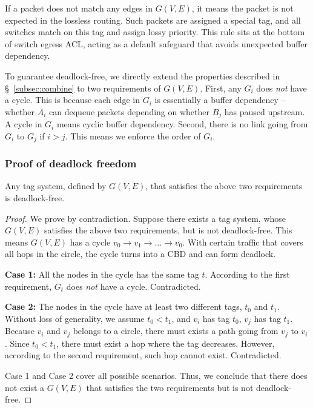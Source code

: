 If a packet does not match any edges in $G(V,E)$, it means the packet is not 
expected in the lossless routing.
Such packets are assigned a special tag, and all switches match on this tag and 
assign lossy priority. This rule sits at the bottom of switch egress ACL, acting 
as a default safeguard that avoids unexpected buffer dependency.

To guarantee deadlock-free, we directly extend the properties described 
in \S~\ref{subsec:combine} to two requirements of $G(V,E)$. First, any 
$G_i$ does {\em not} have a cycle. This is because each edge in $G_i$ is 
essentially a buffer dependency -- whether $A_i$ can dequeue packets depending on whether
$B_j$ has paused upstream. A cycle in $G_i$ means cyclic buffer dependency.
Second, there is no link going from $G_i$ to $G_j$ if $i>j$. 
This means we enforce the order of $G_i$.

\subsubsection{Proof of deadlock freedom}

\begin{theorem}
Any tag system, defined by $G(V,E)$, that satisfies the above two requirements is deadlock-free.
\end{theorem}

\begin{proof}
We prove by contradiction. Suppose there exists a tag system,
whose $G(V,E)$ satisfies the above two requirements, but is not deadlock-free. This means
$G(V,E)$ has a cycle $v_0 \rightarrow v_1 \rightarrow ... \rightarrow v_0$. With certain 
traffic that covers all hops in the circle, the cycle turns into a CBD and can form deadlock.

\textbf{Case 1:} All the nodes in the cycle has the same tag $t$. According to
the first requirement, $G_t$ does {\em not} have a cycle. Contradicted.

\textbf{Case 2:} The nodes in the cycle have at least two different tags, $t_0$ and $t_1$.
Without loss of generality, we assume $t_0 < t_1$, and $v_i$ has tag $t_0$, $v_j$
has tag $t_1$. Because $v_i$ and $v_j$ belongs to a circle, there must exists 
a path going from $v_j$ to $v_i$. Since $t_0 < t_1$, there must exist a hop where
the tag decreases. However, according to the second requirement, such hop cannot
exist. Contradicted.

Case 1 and Case 2 cover all possible scenarios. Thus, we conclude that there does not 
exist a $G(V,E)$ that satisfies the two requirements but is not deadlock-free.
\end{proof}

